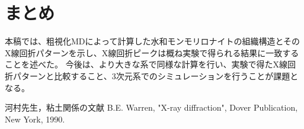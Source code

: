 ﻿\documentclass[11pt,a4j]{jarticle}
\begin{document}
\section{まとめ}
本稿では、粗視化MDによって計算した水和モンモリロナイトの組織構造とそのX線回折パターンを示し、X線回折ピークは概ね実験で得られる結果に一致することを述べた。
今後は、より大きな系で同様な計算を行い、実験で得たX線回折パターンと比較すること、3次元系でのシミュレーションを行うことが課題となる。
\begin{thebibliography}{99}
	河村先生，粘土関係の文献
	B.E. Warren, "X-ray diffraction", Dover Publication, New York, 1990.
\end{thebibliography}
\end{document}
